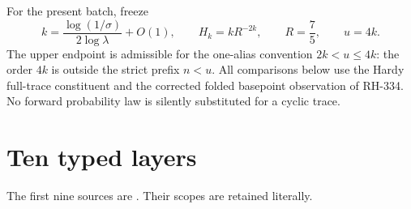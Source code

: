 \documentclass[11pt]{article}
\theoremstyle{remark}
\begin{document}
For the present batch, freeze
\begin{equation}\label{eq:clock}
 k=\frac{\log(1/\sigma)}{2\log\lambda}+O(1),
 \qquad H_k=kR^{-2k},
 \qquad R=\frac75,
 \qquad u=4k.
\end{equation}
The upper endpoint is admissible for the one-alias convention
$2k<u\le4k$: the order $4k$ is outside the strict prefix $n<u$.
All comparisons below use the Hardy full-trace constituent and the corrected
folded basepoint observation of RH-334.  No forward probability law is
silently substituted for a cyclic trace.

\section{Ten typed layers}

The first nine sources are
\citep{WangRepellingLeg2026,WangTubeEscape2026,WangObservation2026,
WangParityLedger2026,WangProjectorMass2026,WangClock2026,WangFarAtom2026,
WangSidebandAtom2026,WangPrefixSync2026}.  Their scopes are retained
literally.
\end{document}
